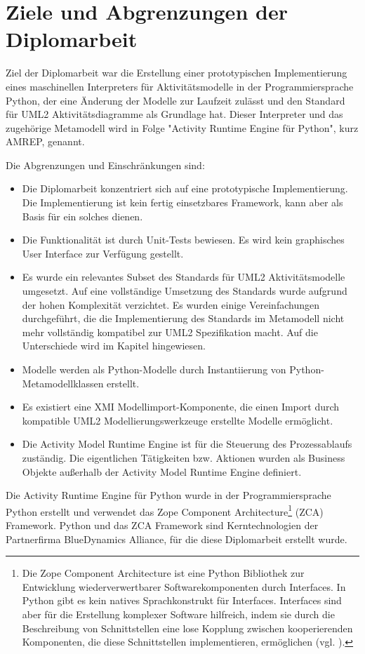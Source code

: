 \chapter{Ziele und Abgrenzungen der Diplomarbeit}\label{intro-ziele}
Ziel der Diplomarbeit war die Erstellung einer prototypischen Implementierung eines maschinellen Interpreters für Aktivitätsmodelle in der Programmiersprache Python, der eine Änderung der Modelle zur Laufzeit zulässt und den Standard für UML2 Aktivitätsdiagramme als Grundlage hat. Dieser Interpreter und das zugehörige Metamodell wird in Folge "Activity Runtime Engine für Python", kurz AMREP, genannt.


Die Abgrenzungen und Einschränkungen sind:
\begin{itemize}
\item Die Diplomarbeit konzentriert sich auf eine prototypische Implementierung. Die Implementierung ist kein fertig einsetzbares Framework, kann aber als Basis für ein solches dienen.
\item Die Funktionalität ist durch Unit-Tests bewiesen. Es wird kein graphisches User Interface zur Verfügung gestellt.
\item Es wurde ein relevantes Subset des Standards für UML2 Aktivitätsmodelle umgesetzt. Auf eine vollständige Umsetzung des Standards wurde aufgrund der hohen Komplexität verzichtet. Es wurden einige Vereinfachungen durchgeführt, die die Implementierung des Standards im Metamodell nicht mehr vollständig kompatibel zur UML2 Spezifikation macht. Auf die Unterschiede wird im Kapitel  hingewiesen.
\item Modelle werden als Python-Modelle durch Instantiierung von Python-Metamodellklassen erstellt.
\item Es existiert eine XMI Modellimport-Komponente, die einen Import durch kompatible UML2 Modellierungswerkzeuge erstellte Modelle ermöglicht.
\item Die Activity Model Runtime Engine ist für die Steuerung des Prozessablaufs zuständig. Die eigentlichen Tätigkeiten bzw. Aktionen wurden als Business Objekte außerhalb der Activity Model Runtime Engine definiert.
\end{itemize}

Die Activity Runtime Engine für Python wurde in der Programmiersprache Python erstellt und verwendet das Zope Component Architecture\footnote
{Die Zope Component Architecture ist eine Python Bibliothek zur Entwicklung wiederverwertbarer Softwarekomponenten durch Interfaces. In Python gibt es kein natives Sprachkonstrukt für Interfaces. Interfaces sind aber für die Erstellung komplexer Software hilfreich, indem sie durch die Beschreibung von Schnittstellen eine lose Kopplung zwischen kooperierenden Komponenten, die diese Schnittstellen implementieren, ermöglichen (vgl. \citep{BaijuM2009}).}
(ZCA) Framework. Python und das ZCA Framework sind Kerntechnologien der Partnerfirma BlueDynamics Alliance, für die diese Diplomarbeit erstellt wurde.

